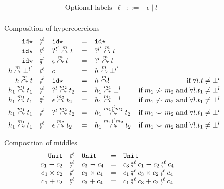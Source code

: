 \documentclass[acmsmall,review]{acmart}\settopmatter{printfolios=true,printccs=false,printacmref=false}
\newcommand{\stxrule}[3]{\text{#2} & #1 & ::= & #3\\}
\newcommand{\comprule}[4]{#1 & \fatsemi^\ell & #2 & = & #3 & #4 \\}
\newcommand{\comprulel}[4]{#1 & \fatsemi^l & #2 & = & #3 & #4 \\}
\newcommand{\plus}[0]{+}
\newcommand{\POOunit}[0]{\mathtt{Unit}}
\newcommand{\POOfun}[2]{#1 \shortrightarrow #2}
\newcommand{\POOprod}[2]{#1 \times #2}
\newcommand{\POOsum}[2]{#1 \plus #2}
\newcommand{\sidecond}[1]{\text{if}\;#1}
\newcommand{\hyperCoercionI}[0]{\mathtt{id\star}}
\newcommand{\hyperCoercionC}[3]{#1 \overset{#2}{\curvearrowright} #3}
\begin{document}
\begin{figure}
  \[
  \begin{array}{lrcl}
  \stxrule{\ell}{Optional labels}{\epsilon \mid l}
  \end{array}
  \]
  
  Composition of hypercoercions 
  \[ 
  \begin{array}{rclclr}
  
  \comprule{
    \hyperCoercionI
  }{
    \hyperCoercionI
  }{
    \hyperCoercionI
  }{}
  
  \comprule{
    \hyperCoercionI
  }{
    \hyperCoercionC{?^{l'}}{m}{t}
  }{
    \hyperCoercionC{?^{l'}}{m}{t}
  }{}
  
  \comprulel{
    \hyperCoercionI
  }{
    \hyperCoercionC{\epsilon}{m}{t}
  }{
    \hyperCoercionC{?^{l}}{m}{t}
  }{}
  
  \comprule{
    \hyperCoercionC{h}{m}{\bot^{l'}}
  }{
    c
  }{
    \hyperCoercionC{h}{m}{\bot^{l'}}
  }{}
  
  \comprule{
    \hyperCoercionC{h}{m}{t}
  }{
    \hyperCoercionI
  }{
    \hyperCoercionC{h}{m}{!}
  }{
    \sidecond{\forall l. t \neq \bot^{l}}
  }
  
  \comprule{
    \hyperCoercionC{h_1}{m_1}{t_1}
  }{
    \hyperCoercionC{?^l}{m_2}{t_2}
  }{
    \hyperCoercionC{h_1}{m_1}{\bot^l}
  }{
    \sidecond{
       m_1 \not\smile m_2
      \; \text{and} \;
      \forall l. t_1 \neq \bot^{l}
    }
  }

\comprulel{
\hyperCoercionC{h_1}{m_1}{t_1}
}{
\hyperCoercionC{\epsilon}{m_2}{t_2}
}{
\hyperCoercionC{h_1}{m_1}{\bot^l}
}{
\sidecond{
  m_1 \not\smile m_2
  \; \text{and} \;
  \forall l. t_1 \neq \bot^{l}
}
}
\comprule{
\hyperCoercionC{h_1}{m_1}{t_1}
}{
\hyperCoercionC{?^l}{m_2}{t_2}
}{
\hyperCoercionC{h_1}{m_1 \fatsemi^{l} m_2}{t_2}
}{
\sidecond{
  m_1 \smile m_2
  \; \text{and} \;
  \forall l. t_1 \neq \bot^{l}
}
}
  \comprule{
    \hyperCoercionC{h_1}{m_1}{t_1}
  }{
    \hyperCoercionC{\epsilon}{m_2}{t_2}
  }{
    \hyperCoercionC{h_1}{m_1 \fatsemi^{\ell} m_2}{t_2}
  }{
    \sidecond{
      m_1 \smile m_2
      \; \text{and} \;
      \forall l. t_1 \neq \bot^{l}
    }
  }
  \end{array}
  \]
  
  Composition of middles 
  \[ 
  \begin{array}{rclclr}
  \comprule{\POOunit}{\POOunit}{
    \POOunit
  }{}
  \comprule{\POOfun{c_1}{c_2}}{\POOfun{c_3}{c_4}}{
    \POOfun{c_3 \fatsemi^{\ell} c_1}{c_2 \fatsemi^\ell c_4}
  }{}
  \comprule{\POOprod{c_1}{c_2}}{\POOprod{c_3}{c_4}}{
    \POOprod{c_1 \fatsemi^\ell c_3}{c_2 \fatsemi^\ell c_4}
  }{}
  \comprule{\POOsum{c_1}{c_2}}{\POOsum{c_3}{c_4}}{
    \POOsum{c_1 \fatsemi^\ell c_3}{c_2 \fatsemi^\ell c_4}
  }{}
  \end{array}
  \]
  

\end{figure}
\end{document}
